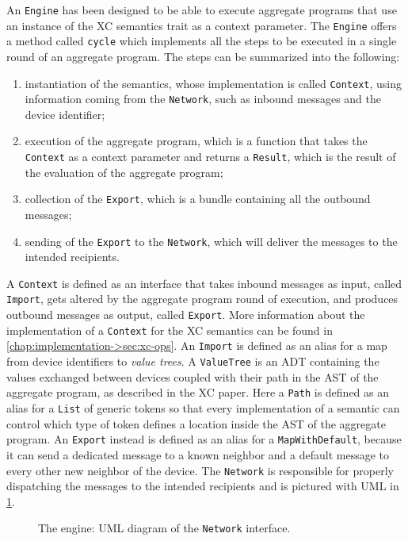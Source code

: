 An \texttt{Engine} has been designed to be able to execute aggregate programs that use an instance of the \ac{XC} semantics trait as a context parameter.
%
The \texttt{Engine} offers a method called \texttt{cycle} which implements all the steps to be executed in a single round of an aggregate program.
%
The steps can be summarized into the following:
\begin{enumerate}
    \item instantiation of the semantics, whose implementation is called \texttt{Context}, using information coming from the \texttt{Network}, such as inbound messages and the device identifier;
    \item execution of the aggregate program, which is a function that takes the \texttt{Context} as a context parameter and returns a \texttt{Result}, which is the result of the evaluation of the aggregate program;
    \item collection of the \texttt{Export}, which is a bundle containing all the outbound messages;
    \item sending of the \texttt{Export} to the \texttt{Network}, which will deliver the messages to the intended recipients.
\end{enumerate}
%
A \texttt{Context} is defined as an interface that takes inbound messages as input, called \texttt{Import}, gets altered by the aggregate program round of execution, and produces outbound messages as output, called \texttt{Export}.
%
More information about the implementation of a \texttt{Context} for the \ac{XC} semantics can be found in \cref{chap:implementation->sec:xc-ops}.
%
An \texttt{Import} is defined as an alias for a map from device identifiers to \textit{value trees}.
%
A \texttt{ValueTree} is an \ac{ADT} containing the values exchanged between devices coupled with their path in the \ac{AST} of the aggregate program, as described in the \ac{XC} paper\cite{xc}.
%
Here a \texttt{Path} is defined as an alias for a \texttt{List} of generic tokens so that every implementation of a semantic can control which type of token defines a location inside the \ac{AST} of the aggregate program.
%
An \texttt{Export} instead is defined as an alias for a \texttt{MapWithDefault}, because it can send a dedicated message to a known neighbor and a default message to every other new neighbor of the device.
%
The \texttt{Network} is responsible for properly dispatching the messages to the intended recipients and is pictured with \ac{UML} in \cref{fig:engine-network-diagram}.

\begin{figure}
    \centering
    \caption{The engine: \ac{UML} diagram of the \texttt{Network} interface.}
    \label{fig:engine-network-diagram}
    \bigskip
    \resizebox{\linewidth}{!}{
        
    }
\end{figure}

